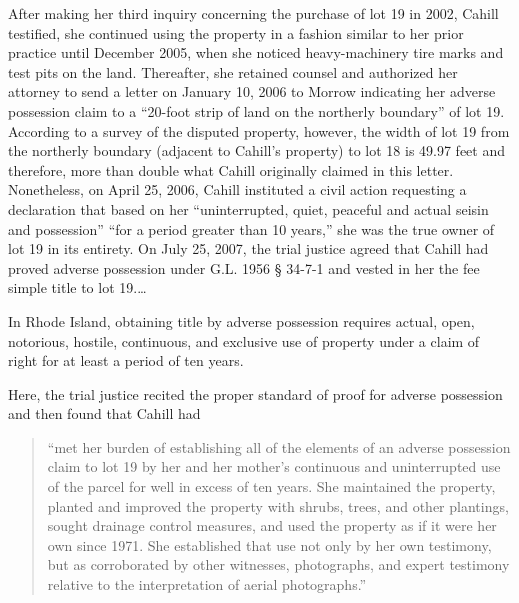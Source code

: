 After making her third inquiry concerning the purchase of lot 19 in 2002, Cahill
testified, she continued using the property in a fashion similar to her prior
practice until December 2005, when she noticed heavy-machinery tire marks and
test pits on the land. Thereafter, she retained counsel and authorized her
attorney to send a letter on January 10, 2006 to Morrow indicating her adverse
possession claim to a ``20-foot strip of land on the northerly boundary'' of
lot 19. According to a survey of the disputed property, however, the width of
lot 19 from the northerly boundary (adjacent to Cahill's property) to lot 18 is
49.97 feet and therefore, more than double what Cahill originally claimed in
this letter. Nonetheless, on April 25, 2006, Cahill instituted a civil action
requesting a declaration that based on her ``uninterrupted, quiet, peaceful and
actual seisin and possession'' ``for a period greater than 10 years,'' she was
the true owner of lot 19 in its entirety. On July 25, 2007, the trial justice
agreed that Cahill had proved adverse possession under G.L. 1956 {\S} 34-7-1
and vested in her the fee simple title to lot 19.\ldots

In Rhode Island, obtaining title by adverse possession requires actual, open,
notorious, hostile, continuous, and exclusive use of property under a claim of
right for at least a period of ten years.

Here, the trial justice recited the proper standard of proof for adverse
possession and then found that Cahill had
\begin{quote}
``met her burden of establishing all of the elements of an adverse possession
claim to lot 19 by her and her mother's continuous and uninterrupted use of the
parcel for well in excess of ten years. She maintained the property, planted
and improved the property with shrubs, trees, and other plantings, sought
drainage control measures, and used the property as if it were her own since
1971. She established that use not only by her own testimony, but as
corroborated by other witnesses, photographs, and expert testimony relative to
the interpretation of aerial photographs.''
\end{quote}

